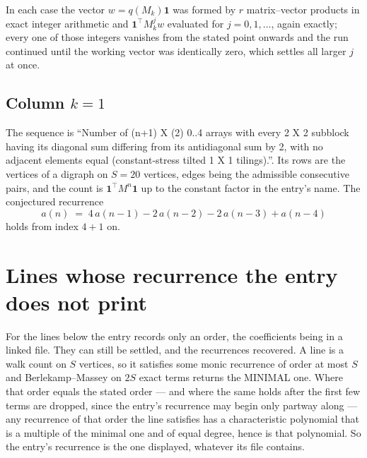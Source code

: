\documentclass[11pt,a4paper]{article}
\theoremstyle{plain}
\theoremstyle{definition}
\begin{document}
In each case the vector $w=q(M_k)\mathbf{1}$ was formed by $r$ matrix--vector products in
exact integer arithmetic and $\mathbf{1}^{\!\top}M_k^{j}w$ evaluated for $j=0,1,\dots$,
again exactly; every one of those integers vanishes from the stated point onwards and the run
continued until the working vector was identically zero, which settles all larger $j$ at once.

\subsection*{Column $k$$=1$}
The sequence is ``Number of (n+1) X (2) 0..4 arrays with every 2 X 2 subblock having its diagonal sum differing from its antidiagonal sum by 2, with no adjacent elements equal (constant-stress tilted 1 X 1 tilings).''. Its rows are the vertices of a digraph on
$S=20$ vertices, edges being the admissible consecutive pairs, and the count is
$\mathbf{1}^{\!\top}M^{n}\mathbf{1}$ up to the constant factor in the entry's name.
The conjectured recurrence
\[
a(n)\;=\;4\,a(n-1) - 2\,a(n-2) - 2\,a(n-3) + a(n-4)
\]
holds from index $4+1$ on.


\section{Lines whose recurrence the entry does not print}

For the lines below the entry records only an order, the coefficients being in a linked file.
They can still be settled, and the recurrences recovered. A line is a walk count on $S$
vertices, so it satisfies some monic recurrence of order at most $S$ and Berlekamp--Massey on
$2S$ exact terms returns the MINIMAL one. Where that order equals the stated order --- and
where the same holds after the first few terms are dropped, since the entry's recurrence may
begin only partway along --- any recurrence of that order the line satisfies has a
characteristic polynomial that is a multiple of the minimal one and of equal degree, hence is
that polynomial. So the entry's recurrence is the one displayed, whatever its file contains.
\end{document}

